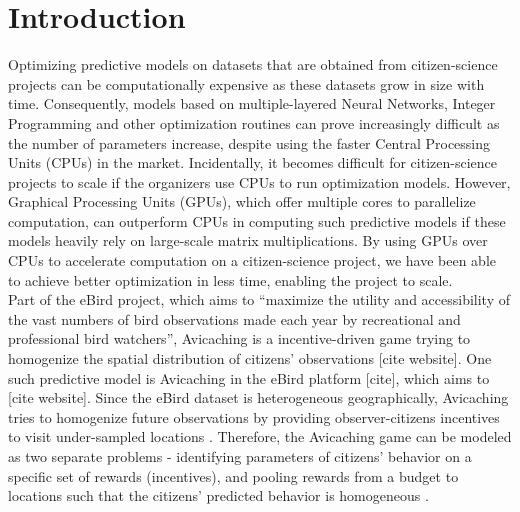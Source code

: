 \documentclass[12pt]{article}
\begin{document}
    \tableofcontents
    \listoftables
    \listoffigures
    \section{Introduction} \label{sec:introduction}
    Optimizing predictive models on datasets that are obtained from citizen-science projects can be computationally expensive as these datasets grow in size with time. Consequently, models based on multiple-layered Neural Networks, Integer Programming and other optimization routines can prove increasingly difficult as the number of parameters increase, despite using the faster Central Processing Units (CPUs) in the market. Incidentally, it becomes difficult for citizen-science projects to scale if the organizers use CPUs to run optimization models. However, Graphical Processing Units (GPUs), which offer multiple cores to parallelize computation, can outperform CPUs in computing such predictive models if these models heavily rely on large-scale matrix multiplications. By using GPUs over CPUs to accelerate computation on a citizen-science project, we have been able to achieve better optimization in less time, enabling the project to scale.\\
    
    Part of the eBird project, which aims to ``maximize the utility and accessibility of the vast numbers of bird observations made each year by recreational and professional bird watchers'', Avicaching is a incentive-driven game trying to homogenize the spatial distribution of citizens' observations [cite website]. One such predictive model is Avicaching \cite{Xue2016Avi1} in the eBird platform [cite], which aims to  [cite website]. Since the eBird dataset is heterogeneous geographically, Avicaching tries to homogenize future observations by providing observer-citizens incentives to visit under-sampled locations \cite{Xue2016Avi1}. Therefore, the Avicaching game can be modeled as two separate problems - identifying parameters of citizens' behavior on a specific set of rewards (incentives), and pooling rewards from a budget to locations such that the citizens' predicted behavior is homogeneous \cite{Xue2016Avi2}.
    
\end{document}
